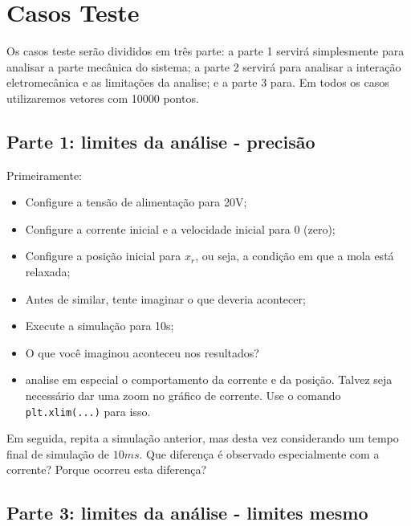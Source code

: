 \documentclass[a4paper]{article}
\theoremstyle{definition}
\theoremstyle{plain}
\begin{document}
\section{Casos Teste}

Os casos teste serão divididos em três parte: a parte 1  servirá simplesmente para analisar a parte mecânica do sistema; a parte 2 servirá para analisar a interação eletromecânica e as limitações da analise; e a parte 3 para. Em todos os casos utilizaremos vetores com 10000 pontos. 



\subsection{Parte 1: limites da análise - precisão}

Primeiramente:

\begin{itemize}
\item Configure a tensão de alimentação para 20V;

\item Configure a corrente inicial e a velocidade inicial para 0 (zero);

\item Configure a posição inicial para $x_r$, ou seja, a condição em que a mola está relaxada;

\item Antes de similar, tente imaginar o que deveria acontecer;

\item Execute a simulação para 10s;

\item O que você imaginou aconteceu nos resultados?

\item analise em especial o comportamento da corrente e da posição. Talvez seja necessário dar uma zoom no gráfico de corrente. Use o comando \verb|plt.xlim(...)| para isso. 
\end{itemize}


Em seguida, repita a simulação anterior, mas desta vez considerando um tempo final de simulação de $10ms$. Que diferença é observado especialmente com a corrente? Porque ocorreu esta diferença?


\subsection{Parte 3: limites da análise - limites mesmo}
\end{document}
